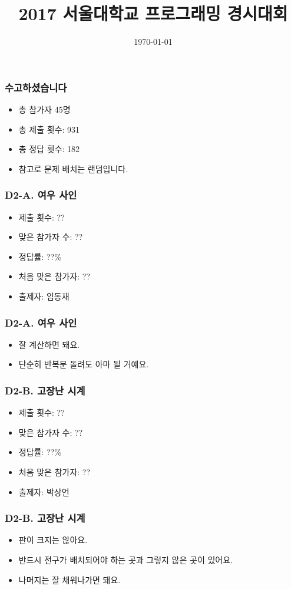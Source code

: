 \documentclass[xetex]{beamer}
\begin{document}
\title{2017 서울대학교 프로그래밍 경시대회}
\date{\today} 

\frame{\titlepage} 

\begin{frame}
  \frametitle{수고하셨습니다}
  \begin{itemize}
    \item 총 참가자 45명
    \item 총 제출 횟수: 931
    \item 총 정답 횟수: 182
    \item 참고로 문제 배치는 랜덤입니다.
  \end{itemize}
\end{frame}

\begin{frame}
  \frametitle{D2-A. 여우 사인}
  \begin{itemize}
    \item 제출 횟수: ??
    \item 맞은 참가자 수: ??
    \item 정답률: ??\%
    \item 처음 맞은 참가자: ??
    \item 출제자: 임동재
  \end{itemize}
\end{frame}

\begin{frame}
  \frametitle{D2-A. 여우 사인}
  \begin{itemize}
    \item 잘 계산하면 돼요.
    \item 단순히 반복문 돌려도 아마 될 거예요.
  \end{itemize}
\end{frame}

\begin{frame}
  \frametitle{D2-B. 고장난 시계}
  \begin{itemize}
    \item 제출 횟수: ??
    \item 맞은 참가자 수: ??
    \item 정답률: ??\%
    \item 처음 맞은 참가자: ??
    \item 출제자: 박상언
  \end{itemize}
\end{frame}

\begin{frame}
  \frametitle{D2-B. 고장난 시계}
  \begin{itemize}
    \item 판이 크지는 않아요.
    \item 반드시 전구가 배치되어야 하는 곳과 그렇지 않은 곳이 있어요.
    \item 나머지는 잘 채워나가면 돼요.
  \end{itemize}
\end{frame}
\end{document}
